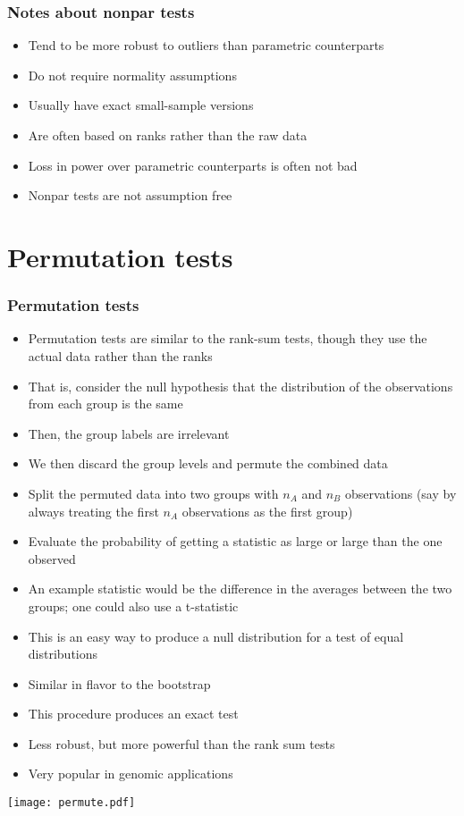 \documentclass[aspectratio=169]{beamer}
\begin{document}
\begin{frame}\frametitle{Notes about nonpar tests}
\begin{itemize}
\item Tend to be more robust to outliers than parametric counterparts
\item Do not require normality assumptions
\item Usually have exact small-sample versions
\item Are often based on ranks rather than the raw data
\item Loss in power over parametric counterparts is often not bad
\item Nonpar tests are not assumption free
\end{itemize}
\end{frame}

\section{Permutation tests}
\begin{frame}\frametitle{Permutation tests}
  \begin{itemize}
  \item Permutation tests are similar to the rank-sum tests, though they use the
    actual data rather than the ranks
  \item That is, consider the null hypothesis that the distribution of the
    observations from each group is the same
  \item Then, the group labels are irrelevant
  \item We then discard the group levels and permute the combined data
  \item Split the permuted data into two groups with $n_A$ and $n_B$
    observations (say by always treating the first $n_A$ observations as
    the first group)
  \item Evaluate the probability of getting a statistic as large or
    large than the one observed
  \item An example statistic would be the difference in the averages between the two groups;
    one could also use a t-statistic 
  \end{itemize}
\end{frame}

\begin{frame}
  \begin{itemize}
  \item This is an easy way to produce a null distribution for a test of equal distributions
  \item Similar in flavor to the bootstrap
  \item This procedure produces an exact test
  \item Less robust, but more powerful than the rank sum tests
  \item Very popular in genomic applications
  \end{itemize}
\end{frame}

\begin{frame}
  \texttt{[image: permute.pdf]}
\end{frame}
\end{document}
